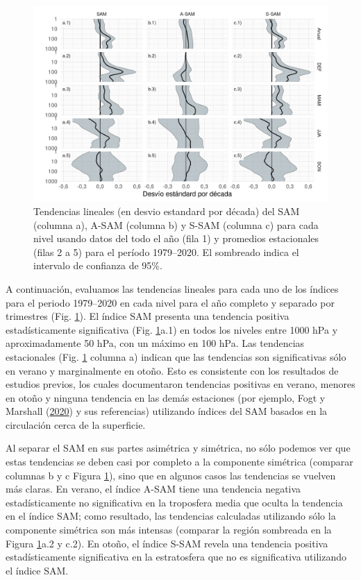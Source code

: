 \documentclass[12pt,oneside,a4paper]{reedthesis}
\begin{document}
\begin{figure}

{\centering \includegraphics{figures/30-sam/trends-1} 

}

\caption{Tendencias lineales (en desvio estandard por década) del SAM (columna a), A-SAM (columna b) y S-SAM (columna c) para cada nivel usando datos del todo el año (fila 1) y promedios estacionales (filas 2 a 5) para el período 1979--2020. El sombreado indica el intervalo de confianza de 95\%.}\label{fig:trends}
\end{figure}

A continuación, evaluamos las tendencias lineales para cada uno de los índices para el periodo 1979--2020 en cada nivel para el año completo y separado por trimestres (Fig. \ref{fig:trends}).
El índice SAM presenta una tendencia positiva estadísticamente significativa (Fig. \ref{fig:trends}a.1) en todos los niveles entre 1000 hPa y aproximadamente 50 hPa, con un máximo en 100 hPa.
Las tendencias estacionales (Fig. \ref{fig:trends} columna a) indican que las tendencias son significativas sólo en verano y marginalmente en otoño.
Esto es consistente con los resultados de estudios previos, los cuales documentaron tendencias positivas en verano, menores en otoño y ninguna tendencia en las demás estaciones (por ejemplo, Fogt y Marshall (\protect\hyperlink{ref-fogt2020}{2020}) y sus referencias) utilizando índices del SAM basados en la circulación cerca de la superficie.

Al separar el SAM en sus partes asimétrica y simétrica, no sólo podemos ver que estas tendencias se deben casi por completo a la componente simétrica (comparar columnas b y c Figura \ref{fig:trends}), sino que en algunos casos las tendencias se vuelven más claras.
En verano, el índice A-SAM tiene una tendencia negativa estadísticamente no significativa en la troposfera media que oculta la tendencia en el índice SAM; como resultado, las tendencias calculadas utilizando sólo la componente simétrica son más intensas (comparar la región sombreada en la Figura \ref{fig:trends}a.2 y c.2).
En otoño, el índice S-SAM revela una tendencia positiva estadísticamente significativa en la estratosfera que no es significativa utilizando el índice SAM.
\end{document}
